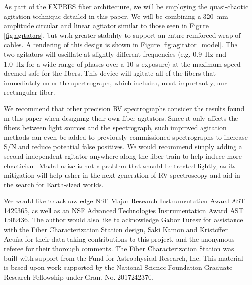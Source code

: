 \documentclass[twocolumn]{emulateapj}
\begin{document}
As part of the EXPRES fiber architecture, we will be employing the quasi-chaotic agitation technique detailed in this paper. We will be combining a \SI{320}{\milli\meter} amplitude circular and linear agitator similar to those seen in Figure \ref{fig:agitators}, but with greater stability to support an entire reinforced wrap of cables. A rendering of this design is shown in Figure \ref{fig:agitator_model}. The two agitators will oscillate at slightly different frequencies (e.g. \SI{0.9}{\hertz} and \SI{1.0}{\hertz} for a wide range of phases over a \SI{10}{\second} exposure) at the maximum speed deemed safe for the fibers. This device will agitate all of the fibers that immediately enter the spectrograph, which includes, most importantly, our rectangular fiber.

We recommend that other precision RV spectrographs consider the results found in this paper when designing their own fiber agitators. Since it only affects the fibers between light sources and the spectrograph, such improved agitation methods can even be added to previously commissioned spectrographs to increase S/N and reduce potential false positives. We would recommend simply adding a second independent agitator anywhere along the fiber train to help induce more chaoticism. Modal noise is not a problem that should be treated lightly, as its mitigation will help usher in the next-generation of RV spectroscopy and aid in the search for Earth-sized worlds.

\acknowledgments

We would like to acknowledge NSF Major Research Instrumentation Award AST 1429365, as well as an NSF Advanced Technologies Instrumentation Award AST 1509436. The author would also like to acknowledge Gabor Furesz for assistance with the Fiber Characterization Station design, Saki Kamon and Kristoffer Acu\~na for their data-taking contributions to this project, and the anonymous referee for their thorough comments. The Fiber Characterization Station was built with support from the Fund for Astrophysical Research, Inc. This material is based upon work supported by the National Science Foundation Graduate Research Fellowship under Grant No. 2017242370.

\end{document}
